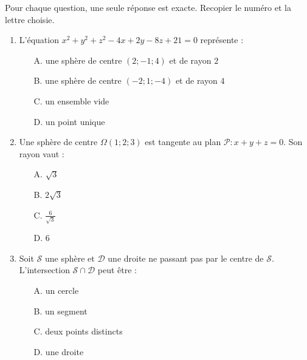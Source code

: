 \documentclass[11pt]{article}
\begin{document}
\begin{exercice}
Pour chaque question, une seule réponse est exacte. Recopier le numéro et la lettre choisie.
\begin{enumerate}
    \item L'équation $x^2+y^2+z^2 - 4x + 2y - 8z + 21 = 0$ représente :
    \begin{itemize}
        \item[A.] une sphère de centre $(2; -1; 4)$ et de rayon $2$
        \item[B.] une sphère de centre $(-2; 1; -4)$ et de rayon $4$
        \item[C.] un ensemble vide
        \item[D.] un point unique
    \end{itemize}
    \item Une sphère de centre $\Omega(1;2;3)$ est tangente au plan $\mathcal{P} : x + y + z = 0$. Son rayon vaut :
    \begin{itemize}
        \item[A.] $\sqrt{3}$
        \item[B.] $2\sqrt{3}$
        \item[C.] $\frac{6}{\sqrt{3}}$
        \item[D.] $6$
    \end{itemize}
    \item Soit $\mathcal{S}$ une sphère et $\mathcal{D}$ une droite ne passant pas par le centre de $\mathcal{S}$. L'intersection $\mathcal{S} \cap \mathcal{D}$ peut être :
    \begin{itemize}
        \item[A.] un cercle
        \item[B.] un segment
        \item[C.] deux points distincts
        \item[D.] une droite
    \end{itemize}
\end{enumerate}
\end{exercice}
\end{document}
